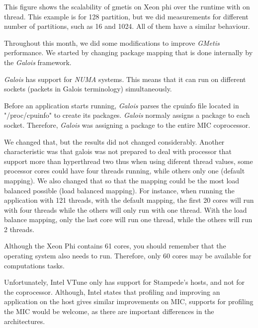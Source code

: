 \documentclass[abstract=on,9pt,twocolumn]{scrartcl}
\begin{document}
This figure shows the scalability of gmetis on Xeon phi over the runtime
with on thread. This example is for 128 partition, but we did
measurements for different number of partitions, such as 16 and 1024. All
of them have a similar behaviour.



Throughout this month, we did some modifications to improve
\textit{GMetis} performance. We started by changing package mapping that
is done internally by the \textit{Galois} framework.

\textit{Galois} has support for \textit{NUMA} systems. This means that
it can run on different sockets (packets in Galois terminology) simultaneously.

Before an application starts running, \textit{Galois} parses the
cpuinfo file located in "/proc/cpuinfo" to create its packages.
\textit{Galois} normaly assigns a package to each socket. Therefore,
\textit{Galois} was assigning a package to the entire MIC coprocessor.

We changed that, but the results did not changed considerably.
Another characteristic was that galois was not prepared to deal with
processor that support more than hyperthread two thus when using diferent
thread values, some processor cores could have four threads running,
while others only one (default mapping). We also changed that so that the mapping could be
the most load balanced possible (load balanced mapping). For instance,
when running the application with 121 threads, with the default mapping,
the first 20 cores will run with four threads while the others will only
run with one thread. With the load balance mapping, only the last core
will run one thread, while the others will run 2 threads.

Although the Xeon Phi contains 61 cores, you should remember that the
operating system also needs to run. Therefore, only 60 cores may be
available for computations tasks.


Unfortunately, Intel VTune only has support for Stampede's hosts, and
not for the coprocessor. Although, Intel states that profiling and
improving an application on the host gives similar improvements on MIC,
supports for profiling the MIC would be welcome, as there are important
differences in the architectures.
\end{document}
